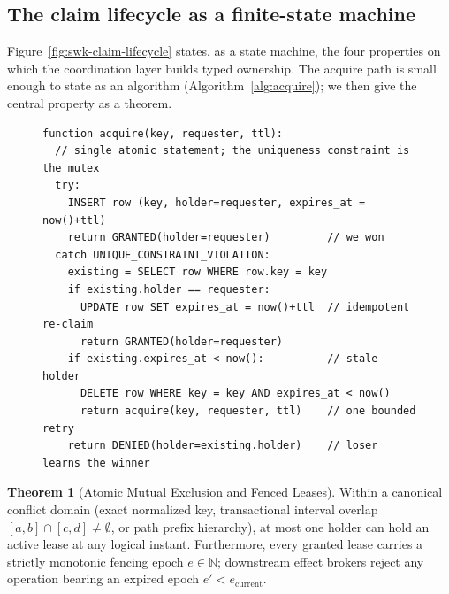\documentclass[11pt,a4paper]{article}
\theoremstyle{definition}
\newtheorem{theorem}{Theorem}[section]
\theoremstyle{remark}
\begin{document}
\subsection{The claim lifecycle as a finite-state machine}



Figure~\ref{fig:swk-claim-lifecycle} states, as a state machine, the four
properties on which the coordination layer builds typed ownership. The acquire
path is small enough to state as an algorithm (Algorithm~\ref{alg:acquire}); we
then give the central property as a theorem.

\begin{figure}[H]
\centering
\begin{minipage}{0.92\textwidth}
\lstset{style=pseudocode}
\begin{lstlisting}[caption={Claim acquisition. The whole acquire is a single
insert against a uniqueness constraint; the loser is handed the current holder,
not an error to retry blindly.},label={alg:acquire},captionpos=b]
function acquire(key, requester, ttl):
  // single atomic statement; the uniqueness constraint is the mutex
  try:
    INSERT row (key, holder=requester, expires_at = now()+ttl)
    return GRANTED(holder=requester)         // we won
  catch UNIQUE_CONSTRAINT_VIOLATION:
    existing = SELECT row WHERE row.key = key
    if existing.holder == requester:
      UPDATE row SET expires_at = now()+ttl  // idempotent re-claim
      return GRANTED(holder=requester)
    if existing.expires_at < now():          // stale holder
      DELETE row WHERE key = key AND expires_at < now()
      return acquire(key, requester, ttl)    // one bounded retry
    return DENIED(holder=existing.holder)    // loser learns the winner
\end{lstlisting}
\end{minipage}
\end{figure}

\begin{theorem}[Atomic Mutual Exclusion and Fenced Leases]\label{thm:exclusion}
Within a canonical conflict domain (exact normalized key, transactional interval overlap $[a, b] \cap [c, d] \neq \emptyset$, or path prefix hierarchy), at most one holder can hold an active lease at any logical instant. Furthermore, every granted lease carries a strictly monotonic fencing epoch $e \in \mathbb{N}$; downstream effect brokers reject any operation bearing an expired epoch $e' < e_{\text{current}}$.
\end{theorem}
\end{document}

